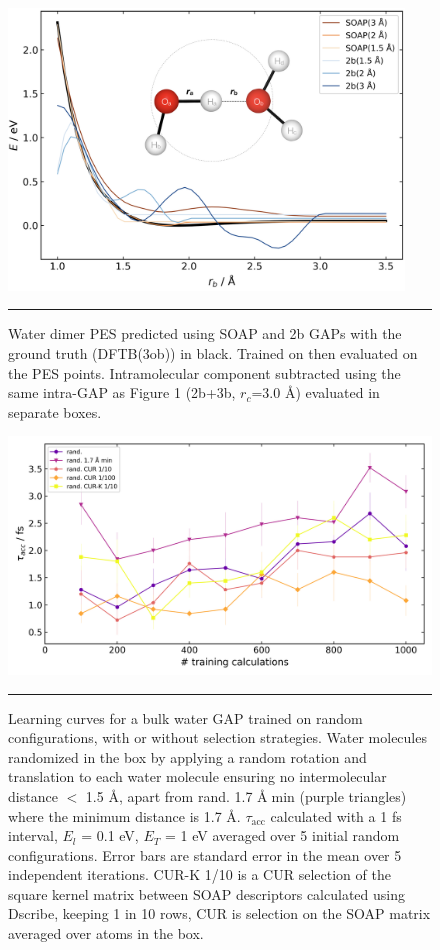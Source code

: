 \documentclass[../../main.tex]{subfiles}
\newcommand{\taua}{$\tau_\text{acc}$ }
\begin{document}
\begin{figure}[h!]
	\vspace{0.4cm}
	\centering
	\includegraphics[width=10.5cm]{6/gap/figs_si/fig3}
	\vspace{0.2cm}
	\hrule
	\caption{Water dimer PES predicted using SOAP and 2b GAPs with the ground truth (DFTB(3ob)) in black. Trained on then evaluated on the PES points. Intramolecular component subtracted using the same intra-GAP as Figure 1 (2b+3b, $r_c$=3.0 \AA) evaluated in separate boxes.}
	\label{fig::ml_si_3}
\end{figure}


\begin{figure}[h!]
	\vspace{0.4cm}
	\centering
	\includegraphics[width=13cm]{6/gap/figs_si/fig4}
	\vspace{0.2cm}
	\hrule
	\caption{Learning curves for a bulk water GAP trained on random configurations, with or without selection strategies. Water molecules randomized in the box by applying a random rotation and translation to each water molecule ensuring no intermolecular distance $<$ 1.5 \AA, apart from rand. 1.7 \AA$\;$min (purple triangles) where the minimum distance is 1.7 \AA. \taua calculated with a 1 fs interval, $E_l$ = 0.1 eV, $E_T$ = 1 eV averaged over 5 initial random configurations. Error bars are standard error in the mean over 5 independent iterations. CUR-K 1/10 is a CUR selection of the square kernel matrix between SOAP descriptors calculated using Dscribe,\cite{Himanen2020} keeping 1 in 10 rows, CUR is selection on the SOAP matrix averaged over atoms in the box.}
	\label{fig::ml_si_4}
\end{figure}
\end{document}
